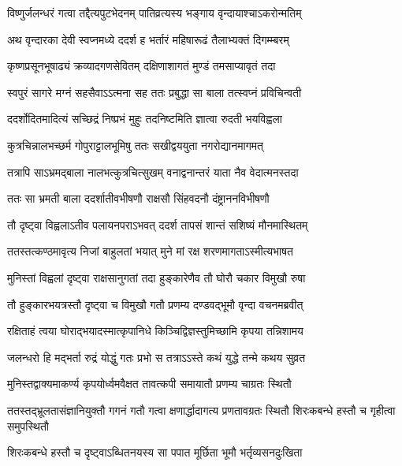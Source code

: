 


\twolineshloka
{विष्णुर्जलन्धरं गत्वा तद्दैत्यपुटभेदनम्}
{पातिव्रत्यस्य भङ्गाय वृन्दायाश्चाऽकरोन्मतिम्} %

\twolineshloka
{अथ वृन्दारका देवी स्वप्नमध्ये ददर्श ह}
{भर्तारं महिषारूढं तैलाभ्यक्तं दिगम्म्बरम्} %

\twolineshloka
{कृष्णप्रसूनभूषाढ्यं क्रव्यादगणसेवितम्}
{दक्षिणाशागतं मुण्डं तमसाप्यावृतं तदा} %

\twolineshloka
{स्वपुरं सागरे मग्नं सहसैवाऽऽत्मना सह}
{ततः प्रबुद्धा सा बाला तत्स्वप्नं प्रविचिन्वती} %

\twolineshloka
{ददर्शोदितमादित्यं सच्छिद्रं निष्प्रभं मुहुः}
{तदनिष्टमिति ज्ञात्वा रुदती भयविह्वला} %

\twolineshloka
{कुत्रचिन्नालभच्छर्म गोपुराट्टालभूमिषु}
{ततः सखीद्वययुता नगरोद्यानमागमत्} %

\twolineshloka
{तत्रापि साऽभ्रमद्बाला नालभत्कुत्रचित्सुखम्}
{वनाद्वनान्तरं याता नैव वेदात्मनस्तदा} %

\twolineshloka
{ततः सा भ्रमती बाला ददर्शातीवभीषणौ}
{राक्षसौ सिंहवदनौ दंष्ट्राननविभीषणौ} %

\twolineshloka
{तौ दृष्ट्वा विह्वलाऽतीव पलायनपराऽभवत्}
{ददर्श तापसं शान्तं सशिष्यं मौनमास्थितम्} %

\twolineshloka
{ततस्तत्कण्ठमावृत्य निजां बाहुलतां भयात्}
{मुने मां रक्ष शरणमागताऽस्मीत्यभाषत} %

\twolineshloka
{मुनिस्तां विह्वलां दृष्ट्वा राक्षसानुगतां तदा}
{हुङ्कारेणैव तौ घोरौ चकार विमुखौ रुषा} %

\twolineshloka
{तौ हुङ्कारभयत्रस्तौ दृष्ट्वा च विमुखौ गतौ}
{प्रणम्य दण्डवद्भूमौ वृन्दा वचनमब्रवीत्} %


\twolineshloka
{रक्षिताहं त्वया घोराद्भयादस्मात्कृपानिधे}
{किञ्चिद्विज्ञस्तुमिच्छामि कृपया तन्निशामय} %

\twolineshloka
{जलन्धरो हि मद्भर्ता रुद्रं योद्धुं गतः प्रभो}
{स तत्राऽऽस्ते कथं युद्धे तन्मे कथय सुव्रत} %


\twolineshloka
{मुनिस्तद्वाक्यमाकर्ण्य कृपयोर्ध्वमवैक्षत}
{तावत्कपी समायातौ प्रणम्य चाग्रतः स्थितौ} %

\threelineshloka
{ततस्तद्भ्रूलतासंज्ञानियुक्तौ गगनं गतौ}
{गत्वा क्षणार्द्धादागत्य प्रणतावग्रतः स्थितौ}
{शिरःकबन्धे हस्तौ च गृहीत्वा समुपस्थितौ} %

\twolineshloka
{शिरःकबन्धे हस्तौ च दृष्ट्वाऽब्धितनयस्य सा}
{पपात मूर्छिता भूमौ भर्तृव्यसनदुःखिता} %

